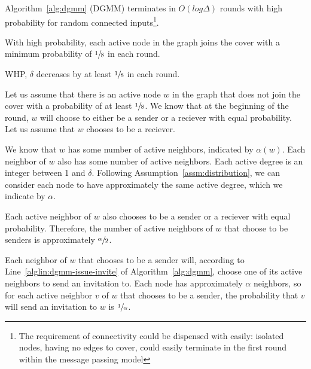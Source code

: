 \begin{lem}
\label{lem:dgmm-log}
Algorithm~\ref{alg:dgmm} (DGMM) terminates in $O(log \Delta)$ rounds with high probability for random connected inputs\footnote{The requirement of connectivity could be dispensed with easily: isolated nodes, having no edges to cover, could easily terminate in the first round within the message passing model}.
\end{lem}




\begin{IEEEproof}
\begin{lprp}
\label{prop:dgmm-log-each}
With high probability, each active node in the graph joins the cover with a minimum probability of $\sfrac{1}{8}$ in each round.
\end{lprp}
\begin{lprp}
\label{prop:dgmm-log-alpha}
WHP, $\delta$ decreases by at least $\sfrac{1}{8}$ in each round.
\end{lprp}
\begin{IEEEproof}
Let us assume that there is an active node $w$ in the graph that does not join the cover with a probability of at least $\sfrac{1}{8}$. We know that at the beginning of the round, $w$ will choose to either be a sender or a reciever with equal probability. Let us assume that $w$ chooses to be a reciever.

We know that $w$ has some number of active neighbors, indicated by $\alpha(w)$. Each neighbor of $w$ also has some number of active neighbors. Each active degree is an integer between 1 and $\delta$. Following Assumption~\ref{assm:distribution}, we can consider each node to have approximately the same active degree, which we indicate by $\alpha$. 

Each active neighbor of $w$ also chooses to be a sender or a reciever with equal probability. Therefore, the number of active neighbors of $w$ that choose to be senders is approximately $\sfrac{\alpha}{2}$. 

Each neighbor of $w$ that chooses to be a sender will, according to Line~\ref{alglin:dgmm-issue-invite} of Algorithm~\ref{alg:dgmm}, choose one of its active neighbors to send an invitation to. Each node has approximately $\alpha$ neighbors, so for each active neighbor $v$ of $w$ that chooses to be a sender, the probability that $v$ will send an invitation to $w$ is $\sfrac{1}{\alpha}$.


\end{IEEEproof}
\end{IEEEproof}
